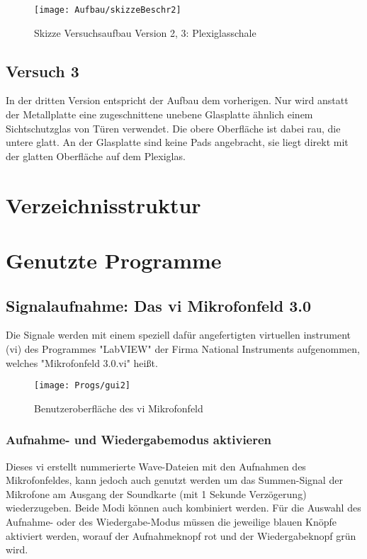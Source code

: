 \begin{figure}[h]
\centering
\texttt{[image: Aufbau/skizzeBeschr2]}
\caption{Skizze Versuchsaufbau Version 2, 3: Plexiglasschale}
\label{fig: Versuchsaufbau Version 2, 3}
\end{figure}

\section{Versuch 3}

In der dritten Version entspricht der Aufbau dem vorherigen. Nur wird anstatt der Metallplatte eine zugeschnittene unebene Glasplatte ähnlich einem Sichtschutzglas von Türen verwendet. Die obere Oberfläche ist dabei rau, die untere glatt. An der Glasplatte sind keine Pads angebracht, sie liegt direkt mit der glatten Oberfläche auf dem Plexiglas.


\newpage
\chapter{Verzeichnisstruktur}




\newpage
\chapter{Genutzte Programme}

\section{Signalaufnahme: Das vi Mikrofonfeld 3.0}

Die Signale werden mit einem speziell dafür angefertigten virtuellen instrument (vi) des Programmes "LabVIEW" der Firma National Instruments aufgenommen, welches "Mikrofonfeld 3.0.vi" heißt. \\
\begin{figure}[h]
	\centering
	\texttt{[image: Progs/gui2]}
	\caption[GUI vi Mikrofonfeld]{Benutzeroberfläche des vi Mikrofonfeld}
	\label{fig:gui2}
\end{figure}

\subsection{Aufnahme- und Wiedergabemodus aktivieren}
Dieses vi erstellt nummerierte Wave-Dateien mit den Aufnahmen des Mikrofonfeldes, kann jedoch auch genutzt werden um das Summen-Signal der Mikrofone am Ausgang der Soundkarte (mit 1 Sekunde Verzögerung) wiederzugeben. Beide Modi können auch kombiniert werden. Für die Auswahl des Aufnahme- oder des Wiedergabe-Modus müssen die jeweilige blauen Knöpfe aktiviert werden, worauf der Aufnahmeknopf rot und der Wiedergabeknopf grün wird.

